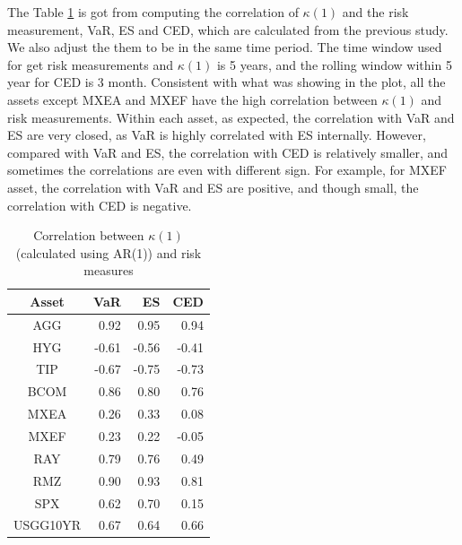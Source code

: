 \documentclass[12pt]{article}
\begin{document}
The Table \ref{table:corSerialRisk} is got from computing the correlation of $\kappa(1)$ and the risk measurement, VaR, ES and CED, which are calculated from the previous study. We also adjust the them to be in the same time period. The time window used for get risk measurements and $\kappa(1)$ is 5 years, and the rolling window within 5 year for CED is 3 month. Consistent with what was showing in the plot, all the assets except MXEA and MXEF have the high correlation between $\kappa(1)$ and risk measurements. Within each asset, as expected, the correlation with VaR and ES are very closed, as VaR is highly correlated with ES internally. However, compared with VaR and ES, the correlation with CED is relatively smaller, and sometimes the correlations are even with different sign. For example, for MXEF asset, the correlation with VaR and ES are positive, and though small, the correlation with CED is negative.

\begin{table}[!h]
\caption{Correlation between $\kappa(1)$ (calculated using AR(1)) and risk measures}
\centering 
\begin{tabular}{ | c || r r r| } 
 \hline
Asset & VaR  & ES & CED \\
  \hline \hline
AGG & 0.92 & 0.95 & 0.94 \\ 
HYG & -0.61 & -0.56 &  -0.41 \\ 
TIP & -0.67 & -0.75 &  -0.73 \\ 
BCOM & 0.86 & 0.80 & 0.76 \\ 
MXEA & 0.26 & 0.33 & 0.08 \\ 
MXEF & 0.23 & 0.22 & -0.05 \\ 
RAY & 0.79 & 0.76 & 0.49 \\ 
RMZ & 0.90 & 0.93 &  0.81 \\ 
SPX & 0.62 & 0.70 & 0.15 \\ 
USGG10YR & 0.67 & 0.64 &  0.66 \\
 \hline
\end{tabular}
\label{table:corSerialRisk}
\end{table}

\iffalse
\end{document}
